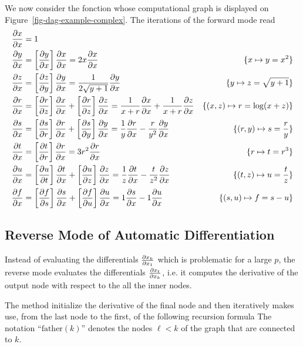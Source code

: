 We now consider the fonction 
whose computational graph is displayed on Figure~\ref{fig-dag-example-complex}. The iterations of the forward mode read
\begin{align*}
		\pd{x}{x} &= 1 \\
		\pd{y}{x} &= \pdb{y}{x} \pd{x}{x}  = 2 x \pd{x}{x}  &
			\{x \mapsto y = x^2\} \\
		\pd{z}{x} &= \pdb{z}{y} \pd{y}{x} = \frac{1}{2\sqrt{y+1}} \pd{y}{x} &
			\{y \mapsto z=\sqrt{y+1}\}\\
		\pd{r}{x} &= \pdb{r}{z} \pd{x}{x} + \pdb{r}{z} \pd{z}{x} = \frac{1}{x+r} \pd{x}{x} + \frac{1}{x+r} \pd{z}{x}&
			\{(x,z) \mapsto r=\log(x+z)\} \\
		\pd{s}{x} &= \pdb{s}{r} \pd{r}{x} + \pdb{s}{y}\pd{y}{x} = \frac{1}{y} \pd{r}{x} - \frac{r}{y^2}\pd{y}{x} &
			\{ (r,y) \mapsto s=\frac{r}{y}  \} \\
		\pd{t}{x} &= \pdb{t}{r} \pd{r}{x} = 3r^2 \pd{r}{x} &
			\{ r \mapsto t = r^3 \} \\
		\pd{u}{x} &= \pdb{u}{t} \pd{t}{x} + \pdb{u}{z}\pd{z}{x} = \frac{1}{z} \pd{t}{x} - \frac{t}{z^2} \pd{z}{x} &
			\{ (t,z) \mapsto u =  \frac{t}{z}  \} \\
		\pd{f}{x} &= \pdb{f}{s}\pd{s}{x} + \pdb{f}{u}\pd{u}{x} = 1 \pd{s}{x} - 1 \pd{u}{x} &
			\{ (s,u) \mapsto f = s-u \}
\end{align*}



\subsection{Reverse Mode of Automatic Differentiation}

Instead of evaluating the differentials $\pd{x_k}{x_1}$ which is problematic for a large $p$, the reverse mode evaluates the differentials  $\pd{x_t}{x_k}$, i.e. it computes the derivative of the output node with respect to the all the inner nodes. 

The method initialize the derivative of the final node
and then iteratively makes use,  from the last node to the first, of the following recursion formula
%
The notation ``$\text{father}(k)$'' denotes the nodes $\ell<k$ of the graph that are connected to $k$.

